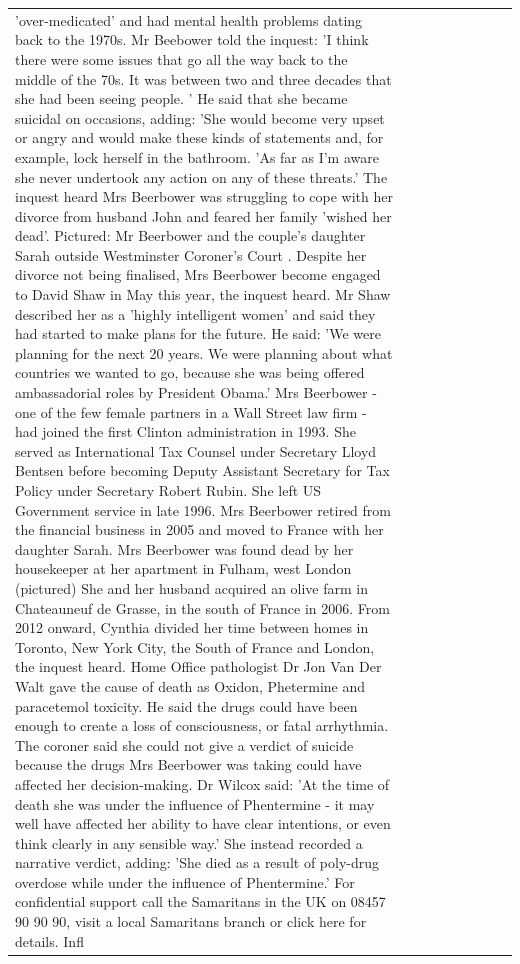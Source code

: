 \begin{table}[H]
\begin{tabular}{lllrlllll}
'over-medicated' and had mental health problems dating back to the 1970s. Mr Beebower told the inquest: 'I think there were some issues that go all the way back to the middle of the 70s. It was between two and three decades that she had been seeing people. ' He said that she became suicidal on occasions, adding: 'She would become very upset or angry and would make these kinds of statements and, for example, lock herself in the bathroom. 'As far as I'm aware she never undertook any action on any of these threats.' The inquest heard Mrs Beerbower was struggling to cope with her divorce from husband John and feared her family 'wished her dead'. Pictured: Mr Beerbower and the couple's daughter Sarah outside Westminster Coroner's Court . Despite her divorce not being finalised, Mrs Beerbower become engaged to David Shaw in May this year, the inquest heard. Mr Shaw described her as a 'highly intelligent women' and said they had started to make plans for the future. He said: 'We were planning for the next 20 years. We were planning about what countries we wanted to go, because she was being offered ambassadorial roles by President Obama.' Mrs Beerbower - one of the few female partners in a Wall Street law firm - had joined the first Clinton administration in 1993. She served as International Tax Counsel under Secretary Lloyd Bentsen before becoming Deputy Assistant Secretary for Tax Policy under Secretary Robert Rubin. She left US Government service in late 1996. Mrs Beerbower retired from the financial business in 2005 and moved to France with her daughter Sarah. Mrs Beerbower was found dead by her housekeeper at her apartment in Fulham, west London (pictured) She and her husband acquired an olive farm in Chateauneuf de Grasse, in the south of France in 2006. From 2012 onward, Cynthia divided her time between homes in Toronto, New York City, the South of France and London, the inquest heard. Home Office pathologist Dr Jon Van Der Walt gave the cause of death as Oxidon, Phetermine and paracetemol toxicity. He said the drugs could have been enough to create a loss of consciousness, or fatal arrhythmia. The coroner said she could not give a verdict of suicide because the drugs Mrs Beerbower was taking could have affected her decision-making. Dr Wilcox said: 'At the time of death she was under the influence of Phentermine - it may well have affected her ability to have clear intentions, or even think clearly in any sensible way.' She instead recorded a narrative verdict, adding: 'She died as a result of poly-drug overdose while under the influence of Phentermine.' For confidential support call the Samaritans in the UK on 08457 90 90 90, visit a local Samaritans branch or click here for details. Infl \\

\end{tabular}
\end{table}

